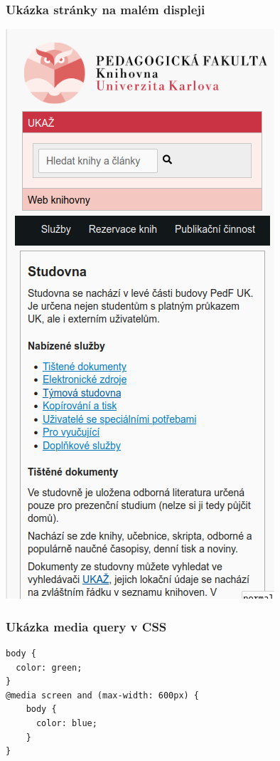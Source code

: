 \begin{frame}
  \frametitle{Ukázka stránky na malém displeji}
  \begin{center}
    \includegraphics[height=.9\textheight]{img/pedf-web-small.png}
  \end{center}
\end{frame}

\begin{frame}[fragile]
\frametitle{Ukázka media query v CSS}
\begin{verbatim}
body {
  color: green;
}
@media screen and (max-width: 600px) {
    body {
      color: blue;
    }
}
\end{verbatim}
          
\end{frame}


